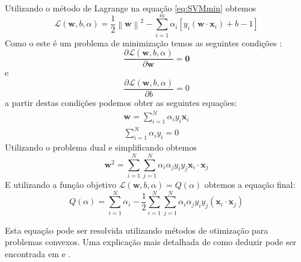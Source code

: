 Utilizando o m\'etodo de Lagrange na equa\c{c}\~ao \ref{eq:SVMmin} obtemos
\begin{equation}\label{eq:SVMLagrange}
\mathcal{L}\left( \textbf{w},b, \alpha \right) =\frac{1}{2} {\left\| \textbf{w} \right\|}^{2} - \sum_{i=1}^{m} \alpha_i \left[ y_i (\textbf{w} \cdot \textbf{x}_i) + b -1 \right] 
\end{equation}
Como o este \'e um problema de minimiza\c{c}\~ao temos as seguintes condi\c{c}\~oes \cite{Haykin2008}:
\begin{equation}\label{eq:SVMLagrangeCD1}
\frac{\partial{\mathcal{L}(\textbf{w},b,\alpha)}}{\partial{\textbf{w}}}=\textbf{0}
\end{equation}
e
\begin{equation}\label{eq:SVMLagrangeCD2}
\frac{\partial{\mathcal{L}(\textbf{w},b,\alpha)}}{\partial{b}}=0
\end{equation}
a partir destas condi\c{c}\~oes podemos obter as seguintes equa\c{c}\~oes:
\begin{eqnarray*}\label{eq:SVMw}
\textbf{w}=\sum_{i=1}^{N}\alpha_i y_i \textbf{x}_i\\
\sum_{i=1}^{N}\alpha_i y_i=0
\end{eqnarray*}
Utilizando o problema dual e simplificando obtemos
\begin{equation}
	\textbf{w}^2= \sum_{i=1}^{N}\sum_{j=1}^{N} \alpha_i \alpha_j y_i y_j \textbf{x}_i \cdot \textbf{x}_j
\end{equation}
E utilizando a fun\c{c}\~ao objetivo $\mathcal{L}(\textbf{w},b,\alpha) = Q(\alpha)$
obtemos a equa\c{c}\~ao final:
\begin{equation}\label{eq:SVMfinal}
	Q(\alpha) = \sum_{i=1}^{N} \alpha_i - \frac{1}{2} \sum_{i=1}^{N} \sum_{j=1}^{N}\alpha_i\alpha_j y_i y_j (\textbf{x}_i \cdot \textbf{x}_j)
\end{equation}

Esta equa\c{c}\~ao pode ser resolvida utilizando m\'etodos de otimiza\c{c}\~ao para problemas convexos.
 Uma explica\c{c}\~ao mais detalhada de como deduzir pode ser encontrada em \cite{SVM2017} e \cite{Haykin2008}.

